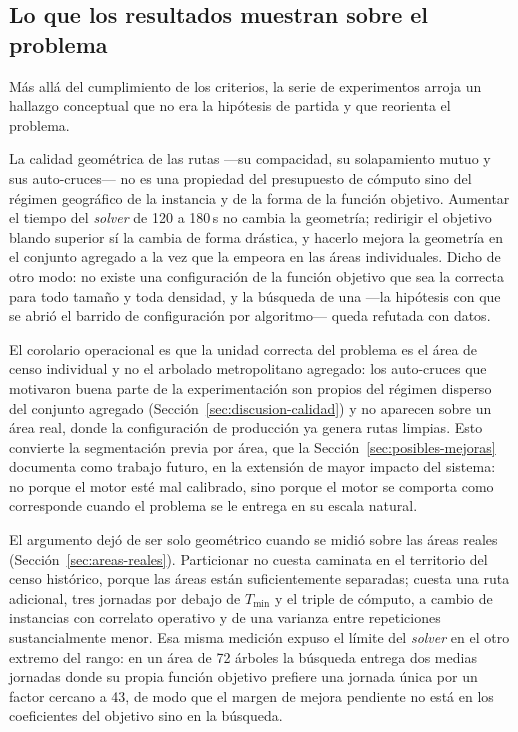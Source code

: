 \subsection{Lo que los resultados muestran sobre el problema}

Más allá del cumplimiento de los criterios, la serie de experimentos arroja un
hallazgo conceptual que no era la hipótesis de partida y que reorienta el problema.

La calidad geométrica de las rutas ---su compacidad, su solapamiento mutuo y sus
auto-cruces--- no es una propiedad del presupuesto de cómputo sino del régimen
geográfico de la instancia y de la forma de la función objetivo. Aumentar el tiempo
del \textit{solver} de 120 a 180\,s no cambia la geometría; redirigir el objetivo
blando superior sí la cambia de forma drástica, y hacerlo mejora la geometría en el
conjunto agregado a la vez que la empeora en las áreas individuales. Dicho de otro
modo: no existe una configuración de la función objetivo que sea la correcta para
todo tamaño y toda densidad, y la búsqueda de una ---la hipótesis con que se abrió el
barrido de configuración por algoritmo--- queda refutada con datos.

El corolario operacional es que la unidad correcta del problema es el área de censo
individual y no el arbolado metropolitano agregado: los auto-cruces que motivaron
buena parte de la experimentación son propios del régimen disperso del conjunto
agregado (Sección~\ref{sec:discusion-calidad}) y no aparecen sobre un área real, donde
la configuración de producción ya genera rutas limpias. Esto convierte la segmentación
previa por área, que la Sección~\ref{sec:posibles-mejoras} documenta como trabajo
futuro, en la extensión de mayor impacto del sistema: no porque el motor esté mal
calibrado, sino porque el motor se comporta como corresponde cuando el problema se le
entrega en su escala natural.

El argumento dejó de ser solo geométrico cuando se midió sobre las áreas reales
(Sección~\ref{sec:areas-reales}). Particionar no cuesta caminata en el territorio
del censo histórico, porque las áreas están suficientemente separadas; cuesta una
ruta adicional, tres jornadas por debajo de $T_{\min}$ y el triple de cómputo, a
cambio de instancias con correlato operativo y de una varianza entre repeticiones
sustancialmente menor. Esa misma medición expuso el límite del \textit{solver} en
el otro extremo del rango: en un área de 72 árboles la búsqueda entrega dos medias
jornadas donde su propia función objetivo prefiere una jornada única por un factor
cercano a 43, de modo que el margen de mejora pendiente no está en los coeficientes
del objetivo sino en la búsqueda.

